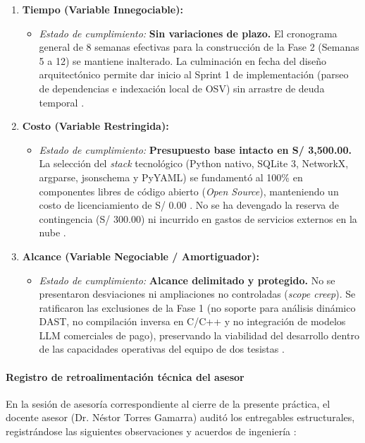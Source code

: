 \begin{enumerate}
    \item \textbf{Tiempo (Variable Innegociable):}
    \begin{itemize}
        \item \textit{Estado de cumplimiento:} \textbf{Sin variaciones de plazo.} El cronograma general de 8 semanas efectivas para la construcción de la Fase 2 (Semanas 5 a 12) se mantiene inalterado. La culminación en fecha del diseño arquitectónico permite dar inicio al Sprint 1 de implementación (parseo de dependencias e indexación local de OSV) sin arrastre de deuda temporal \cite{torres2026proyecto}.
    \end{itemize}

    \item \textbf{Costo (Variable Restringida):}
    \begin{itemize}
        \item \textit{Estado de cumplimiento:} \textbf{Presupuesto base intacto en S/ 3,500.00.} La selección del \textit{stack} tecnológico (Python nativo, SQLite 3, NetworkX, argparse, jsonschema y PyYAML) se fundamentó al 100\% en componentes libres de código abierto (\textit{Open Source}), manteniendo un costo de licenciamiento de S/ 0.00 \cite{ladisa2023sok, openssf2023osv}. No se ha devengado la reserva de contingencia (S/ 300.00) ni incurrido en gastos de servicios externos en la nube \cite{torres2026proyecto}.
    \end{itemize}

    \item \textbf{Alcance (Variable Negociable / Amortiguador):}
    \begin{itemize}
        \item \textit{Estado de cumplimiento:} \textbf{Alcance delimitado y protegido.} No se presentaron desviaciones ni ampliaciones no controladas (\textit{scope creep}). Se ratificaron las exclusiones de la Fase 1 (no soporte para análisis dinámico DAST, no compilación inversa en C/C++ y no integración de modelos LLM comerciales de pago), preservando la viabilidad del desarrollo dentro de las capacidades operativas del equipo de dos tesistas \cite{bogart2016break, torres2026proyecto}.
    \end{itemize}
\end{enumerate}

\paragraph*{Registro de retroalimentación técnica del asesor}
En la sesión de asesoría correspondiente al cierre de la presente práctica, el docente asesor (Dr. Néstor Torres Gamarra) auditó los entregables estructurales, registrándose las siguientes observaciones y acuerdos de ingeniería \cite{torres2026proyecto}:

